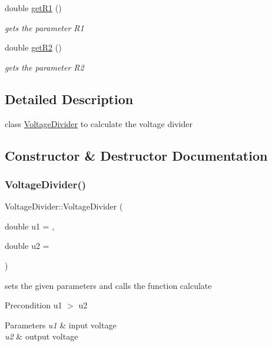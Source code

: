 \begin{DoxyCompactItemize}
double \hyperlink{classVoltageDivider_ac9928564fe59e40e12346222a7eb82a2}{get\+R1} ()
\begin{DoxyCompactList}\small\item\em gets the parameter R1 \end{DoxyCompactList}\item 
double \hyperlink{classVoltageDivider_aa83138c075ea0b37a20d65e4d7cc068b}{get\+R2} ()
\begin{DoxyCompactList}\small\item\em gets the parameter R2 \end{DoxyCompactList}\end{DoxyCompactItemize}


\subsection{Detailed Description}
class \hyperlink{classVoltageDivider}{Voltage\+Divider} to calculate the voltage divider 

\subsection{Constructor \& Destructor Documentation}
\mbox{\label{classVoltageDivider_a7e71609cdfe3faa54ddfde5c7634a92c}} 
\subsubsection{\texorpdfstring{Voltage\+Divider()}{VoltageDivider()}}
{\footnotesize\ttfamily Voltage\+Divider\+::\+Voltage\+Divider (\begin{DoxyParamCaption}\item[{double}]{u1 = {},  }\item[{double}]{u2 = {} }\end{DoxyParamCaption})}



sets the given parameters and calls the function calculate 

\begin{DoxyPrecond}{Precondition}
u1 $>$ u2 
\end{DoxyPrecond}

\begin{DoxyParams}{Parameters}
{\em u1} & input voltage \\
\hline
{\em u2} & output voltage \\
\hline
\end{DoxyParams}



